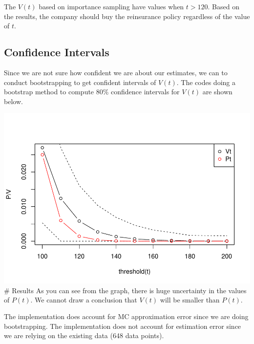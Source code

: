 \documentclass[11pt,]{article}
\newenvironment{Shaded}{\begin{snugshade}}{\end{snugshade}}
\newcommand{\CommentTok}[1]{\textcolor[rgb]{0.56,0.35,0.01}{\textit{#1}}}
\newcommand{\DecValTok}[1]{\textcolor[rgb]{0.00,0.00,0.81}{#1}}
\newcommand{\FloatTok}[1]{\textcolor[rgb]{0.00,0.00,0.81}{#1}}
\newcommand{\KeywordTok}[1]{\textcolor[rgb]{0.13,0.29,0.53}{\textbf{#1}}}
\newcommand{\NormalTok}[1]{#1}
\newcommand{\OperatorTok}[1]{\textcolor[rgb]{0.81,0.36,0.00}{\textbf{#1}}}
\newcommand{\StringTok}[1]{\textcolor[rgb]{0.31,0.60,0.02}{#1}}
\begin{document}
The \(V(t)\) based on importance sampling have values when \(t>120\).
Based on the results, the company should buy the reinsurance policy
regardless of the value of \(t\).

\hypertarget{confidence-intervals}{%
\subsection{Confidence Intervals}\label{confidence-intervals}}

Since we are not sure how confident we are about our estimates, we can
to conduct bootstrapping to get confident intervals of \(V(t)\). The
codes doing a bootstrap method to compute 80\% confidence intervals for
\(V(t)\) are shown below.

\begin{Shaded}
\end{Shaded}

\includegraphics{figs/unnamed-chunk-30.pdf} \# Results As you can see
from the graph, there is huge uncertainty in the values of \(P(t)\). We
cannot draw a conclusion that \(V(t)\) will be smaller than \(P(t)\).

The implementation does account for MC approximation error since we are
doing bootstrapping. The implementation does not account for estimation
error since we are relying on the existing data (648 data points).





\newpage
\singlespacing 

\end{document}
